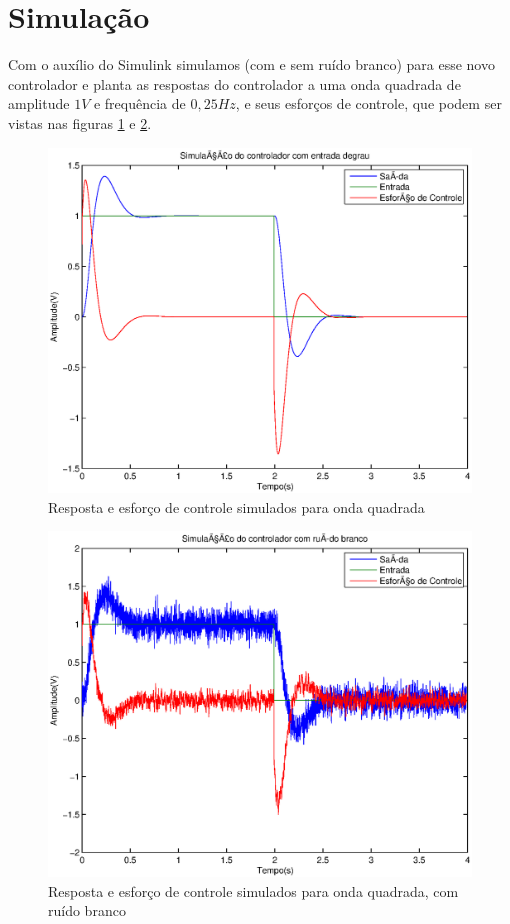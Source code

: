 \documentclass{article}
\begin{document}
\section{Simulação}
Com o auxílio do Simulink simulamos (com e sem ruído branco) para esse novo controlador e planta as respostas do controlador a uma onda quadrada de amplitude $1V$ e frequência de $0,25Hz$, e seus esforços de controle, que podem ser vistas nas figuras \ref{fig:yur} e \ref{fig:yurN}.
\begin{figure}[H]
	\centering
	\includegraphics[width=0.8\linewidth]{../yur}
	\caption{Resposta e esforço de controle simulados para onda quadrada}
	\label{fig:yur}
\end{figure}
\begin{figure}[H]
	\centering
	\includegraphics[width=0.8\linewidth]{../yurN}
	\caption{Resposta e esforço de controle simulados para onda quadrada, com ruído branco}
	\label{fig:yurN}
\end{figure}
\end{document}
